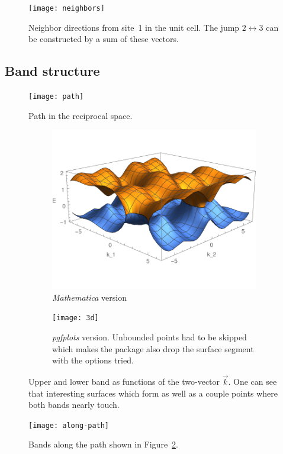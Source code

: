 \documentclass[11pt, english, fleqn, DIV=15, headinclude, BCOR=1cm]{scrartcl}
\begin{document}
\begin{figure}
    \centering
    \texttt{[image: neighbors]}
    \caption{%
        Neighbor directions from site~1 in the unit cell. The jump $2
        \leftrightarrow 3$ can be constructed by a sum of these vectors.
    }
    \label{fig:neighbors}
\end{figure}

\subsection{Band structure}

\begin{figure}
    \centering
    \texttt{[image: path]}
    \caption{%
        Path in the reciprocal space.
    }
    \label{fig:path}
\end{figure}

\begin{figure}
    \begin{subfigure}[c]{0.49\linewidth}
    \centering
    \includegraphics[width=\linewidth]{2-Eigenvalues.pdf}
    \caption{%
        \emph{Mathematica} version
    }
    \label{fig:}
    \end{subfigure}
    \hfill
    \begin{subfigure}[c]{0.49\linewidth}
    \centering
    \texttt{[image: 3d]}
    \caption{%
        \emph{pgfplots} version. Unbounded points had to be skipped which makes
        the package also drop the surface segment with the options tried.
    }
    \label{fig:}
    \end{subfigure}
    \caption{%
        Upper and lower band as functions of the two-vector $\vec k$. One can
        see that interesting surfaces which form as well as a couple points
        where both bands nearly touch.
    }
    \label{fig:band-3d}
\end{figure}

\begin{figure}
    \centering
    \texttt{[image: along-path]}
    \caption{%
        Bands along the path shown in Figure~\ref{fig:path}.
    }
    \label{fig:along-path}
\end{figure}
\end{document}
